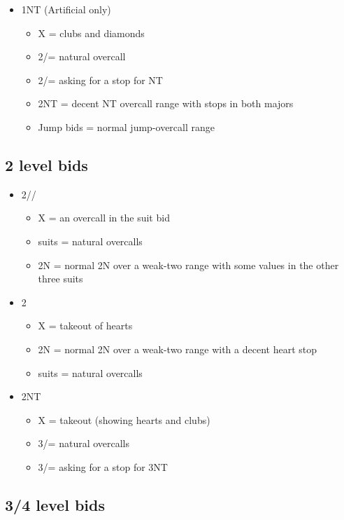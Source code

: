 \begin{itemize}
\item 1NT (Artificial only)
	\begin{itemize}
	\item X = clubs and diamonds
	\item 2\clubs/\diamonds = natural overcall
	\item 2\hearts/\spades = asking for a stop for NT
	\item 2NT = decent NT overcall range with stops in both majors
	\item Jump bids = normal jump-overcall range
	\end{itemize}
\end{itemize}

\subsection{2 level bids}

\begin{itemize}
\item 2\clubs/\diamonds/\hearts
	\begin{itemize}
	\item X = an overcall in the suit bid
	\item suits = natural overcalls
	\item 2N = normal 2N over a weak-two range with some values in the other three suits
	\end{itemize}
\item 2\spades
	\begin{itemize}
	\item X = takeout of hearts
	\item 2N = normal 2N over a weak-two range with a decent heart stop
	\item suits = natural overcalls
	\end{itemize}
\item 2NT
	\begin{itemize}
	\item X = takeout (showing hearts and clubs)
	\item 3\clubs/\hearts = natural overcalls
	\item 3\diamonds/\spades = asking for a stop for 3NT
	\end{itemize}
\end{itemize}

\subsection{3/4 level bids}

